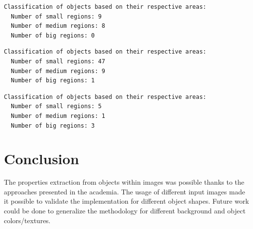 \documentclass[]{IEEEtran}
\begin{document}
\begin{lstlisting}[language=sh, caption={Output for Histogram of Areas for Image 0}, label={code:out-2-1}]
  Classification of objects based on their respective areas:
  Number of small regions: 9
  Number of medium regions: 8
  Number of big regions: 0
\end{lstlisting}

\begin{lstlisting}[language=sh, caption={Output for Histogram of Areas for Image 1}, label={code:out-2-2}]
  Classification of objects based on their respective areas:
  Number of small regions: 47
  Number of medium regions: 9
  Number of big regions: 1  
\end{lstlisting}

\begin{lstlisting}[language=sh, caption={Output for Histogram of Areas for Image 2}, label={code:out-2-3}]
  Classification of objects based on their respective areas:
  Number of small regions: 5
  Number of medium regions: 1
  Number of big regions: 3  
\end{lstlisting}

\section{Conclusion}
The properties extraction from objects within images was possible thanks to the approaches presented in the academia.
The usage of different input images made it possible to validate the implementation for different object shapes. Future work could be done to generalize the methodology for different background and object colors/textures. 



\end{document}
